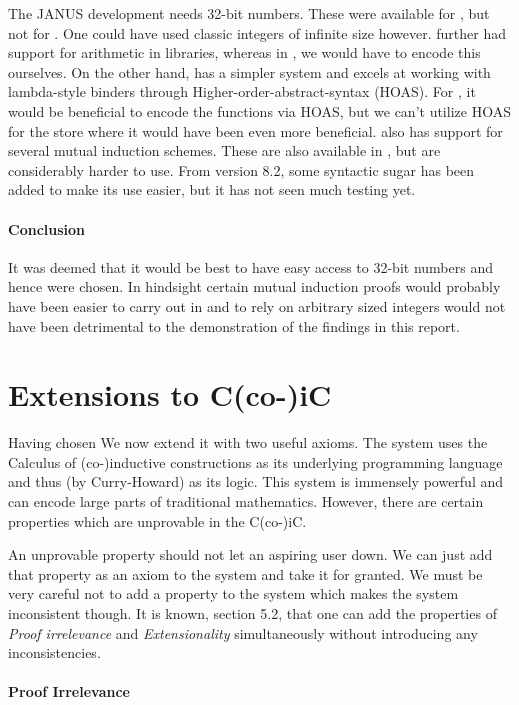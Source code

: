 The JANUS development needs 32-bit numbers. These were available for
\coq{}, but not for \twelf{}. One could have used classic integers of
infinite size however. \coq{} further had support for arithmetic in
libraries, whereas in \twelf{}, we would have to encode this
ourselves. On the other hand, \twelf{} has a simpler system and excels
at working with lambda-style binders through
Higher-order-abstract-syntax (HOAS). For \twelf{}, it would be
beneficial to encode the functions via HOAS, but we can't utilize HOAS
for the store where it would have been even more beneficial. \twelf{}
also has support for several mutual induction schemes. These are also
available in \coq{}, but are considerably harder to use. From \coq{}
version 8.2, some syntactic sugar has been added to make its
use easier, but it has not seen much testing yet.

\paragraph{Conclusion}
It was deemed that it would be best to have easy access to 32-bit
numbers and hence \coq{} were chosen. In hindsight certain mutual
induction proofs would probably have been easier to carry out in
\twelf{} and to rely on arbitrary sized integers would not have been
detrimental to the demonstration of the findings in this report.

\section{Extensions to C(co-)iC}

Having chosen \coq{} We now extend it with two useful axioms. The
system uses the Calculus of (co-)inductive constructions as its
underlying programming language and thus (by Curry-Howard) as its
logic. This system is immensely powerful and can encode large parts of
traditional mathematics. However, there are certain properties which
are unprovable in the C(co-)iC.

An unprovable property should not let an aspiring \coq{} user down. We
can just add that property as an axiom to the system and take it for
granted. We must be very careful not to add a property to the system
which makes the system inconsistent though. It is known,
\cite{team:coq} section 5.2, that one can add the properties of \emph{Proof
  irrelevance} and \emph{Extensionality} simultaneously without
introducing any inconsistencies.

\paragraph{Proof Irrelevance}
\label{sec:proof-irrelevance}

